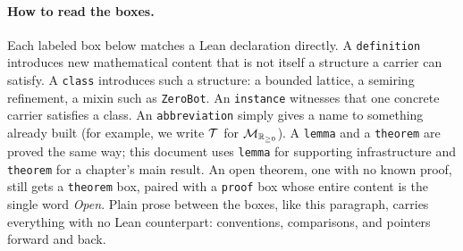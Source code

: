 \paragraph{How to read the boxes.} Each labeled box below matches a
Lean declaration directly. A \texttt{definition} introduces new
mathematical content that is not itself a structure a carrier can
satisfy. A \texttt{class} introduces such a structure: a bounded
lattice, a semiring refinement, a mixin such as \texttt{ZeroBot}. An
\texttt{instance} witnesses that one concrete carrier satisfies a
class. An \texttt{abbreviation} simply gives a name to something
already built (for example, we write $\mathcal T$ for $\mathcal M_{\mathbb R_{\ge 0}}$). A
\texttt{lemma} and a \texttt{theorem} are proved the same way; this
document uses \texttt{lemma} for supporting infrastructure and
\texttt{theorem} for a chapter's main result. An open theorem, one with
no known proof, still gets a \texttt{theorem} box, paired with a
\texttt{proof} box whose entire content is the single word \emph{Open}.
Plain prose between the boxes, like this paragraph, carries everything
with no Lean counterpart: conventions, comparisons, and pointers
forward and back.
